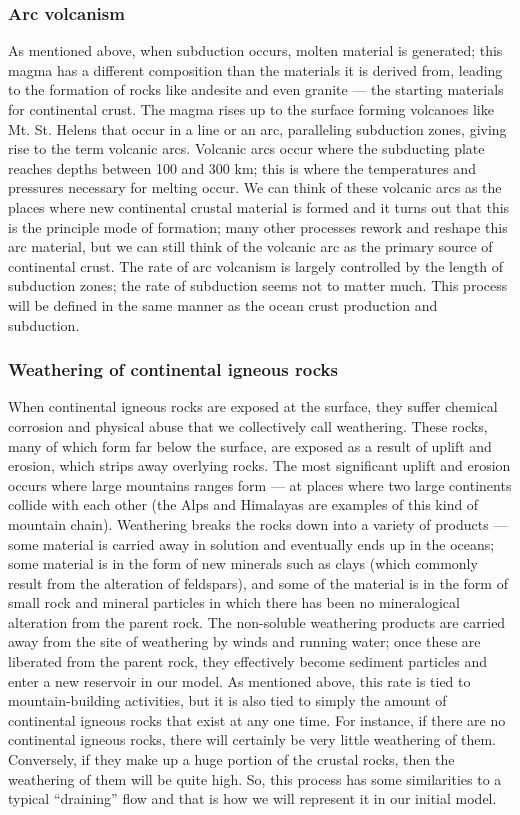 \documentclass[11pt,letterpaper]{article}
\begin{document}
\subsubsection{Arc volcanism}
As mentioned above, when subduction occurs, molten material is generated; this magma has a different composition than the materials it is derived from, leading to the formation of rocks like andesite and even granite --- the starting materials for continental crust. The magma rises up to the surface forming volcanoes like Mt. St. Helens that occur in a line or an arc, paralleling subduction zones, giving rise to the term volcanic arcs. Volcanic arcs occur where the subducting plate reaches depths between 100 and 300 km; this is where the temperatures and pressures necessary for melting occur. We can think of these volcanic arcs as the places where new continental crustal material is formed and it turns out that this is the principle mode of formation; many other processes rework and reshape this arc material, but we can still think of the volcanic arc as the primary source of continental crust. The rate of arc volcanism is largely controlled by the length of subduction zones; the rate of subduction seems not to matter much. This process will be defined in the same manner as the ocean crust production and subduction.

\subsubsection{Weathering of continental igneous rocks}
When continental igneous rocks are exposed at the surface, they suffer chemical corrosion and physical abuse that we collectively call weathering. These rocks, many of which form far below the surface, are exposed as a result of uplift and erosion, which strips away overlying rocks. The most significant uplift and erosion occurs where large mountains ranges form --- at places where two large continents collide with each other (the Alps and Himalayas are examples of this kind of mountain chain). Weathering breaks the rocks down into a variety of products --- some material is carried away in solution and eventually ends up in the oceans; some material is in the form of new minerals such as clays (which commonly result from the alteration of feldspars), and some of the material is in the form of small rock and mineral particles in which there has been no mineralogical alteration from the parent rock. The non-soluble weathering products are carried away from the site of weathering by winds and running water; once these are liberated from the parent rock, they effectively become sediment particles and enter a new reservoir in our model. As mentioned above, this rate is tied to mountain-building activities, but it is also tied to simply the amount of continental igneous rocks that exist at any one time. For instance, if there are no continental igneous rocks, there will certainly be very little weathering of them. Conversely, if they make up a huge portion of the crustal rocks, then the weathering of them will be quite high. So, this process has some similarities to a typical ``draining'' flow and that is how we will represent it in our initial model.
\end{document}
